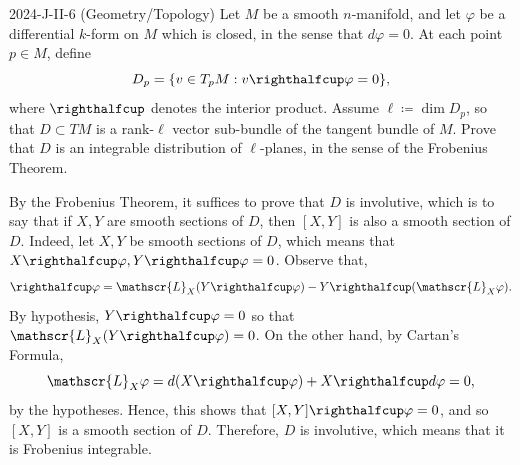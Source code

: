 \documentclass{article}
\begin{document}
\begin{prb}{2024-J-II-6 (Geometry/Topology)}
	Let $M$ be a smooth $n$-manifold, and let $\varphi$ be a differential $k$-form on $M$ which is closed, in the sense that $d\varphi = 0$. At each point $p \in M$, define 
		\begin{equation}
			D_{p}= \brac*{v \in T_{p}M: v\righthalfcup\varphi = 0}, 
		\end{equation}
	where $\righthalfcup$ denotes the interior product. Assume $\ell \coloneqq \dim{D_{p}}$, so that $D \subset TM$ is a rank-$\ell$ vector sub-bundle of the tangent bundle of $M$. Prove that $D$ is an integrable distribution of $\ell$-planes, in the sense of the Frobenius Theorem. 
\end{prb}
\begin{solutions}
	By the Frobenius Theorem, it suffices to prove that $D$ is involutive, which is to say that if $X, Y$ are smooth sections of $D$, then $[X, Y]$ is also a smooth section of $D$. Indeed, let $X, Y$ be smooth sections of $D$, which means that $X\righthalfcup \varphi, Y\righthalfcup \varphi = 0$. Observe that,
		\begin{equation}
			[X,Y]\righthalfcup \varphi = \mathscr{L}_{X}(Y\righthalfcup \varphi) - Y\righthalfcup(\mathscr{L}_{X}\varphi). 
		\end{equation}
	By hypothesis, $Y \righthalfcup \varphi = 0$ so that $\mathscr{L}_{X}(Y \righthalfcup \varphi) = 0$. On the other hand, by Cartan's Formula, 
		\begin{equation}
			\mathscr{L}_{X}\varphi = d(X\righthalfcup \varphi) + X\righthalfcup d\varphi = 0, 
		\end{equation}
	by the hypotheses. Hence, this shows that $[X, Y] \righthalfcup \varphi = 0$, and so $[X, Y]$ is a smooth section of $D$. Therefore, $D$ is involutive, which means that it is Frobenius integrable. 
\end{solutions}
\end{document}
